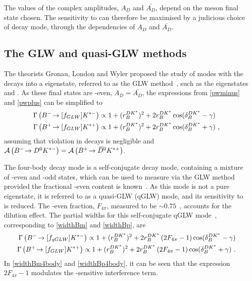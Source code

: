 The values of the complex amplitudes, $A_{D}$ and $\bar{A_{D}}$, depend on the \D meson final state chosen. The sensitivity to \Pgamma can therefore be maximised by a judicious choice of \Dz decay mode, through the dependencies of $A_{D}$ and $\bar{A_{D}}$.

\subsection{The GLW and quasi-GLW methods}
\label{sec:theory:glw}

The theorists Gronau, London and Wyler proposed the study of \decay{\Bm}{\D\Km} modes with the \D decays into a \CP eigenstate, referred to as the GLW method~\cite{GL,GW}, such as the eigenstates \decay{\Dz}{\Kp\Km} and \decay{\Dz}{\pip\pim}. As these final states are \CP-even, $A_{D} = \bar{A_{D}}$, the expressions from \eqns\ref{pwminus} and \ref{pwplus} can be simplified to
\begin{align}
\Gamma\left({{{B}^-}}\!\rightarrow [f_{GLW}]{\ensuremath{{K}^{*-}}}\right) &\propto 1 + (r_B^{DK^*})^2 + 2r_B^{DK^*}\cos(\delta_B^{DK^*} - \gamma) \label{widthBm} \\
\Gamma\left({{{B}^+}}\!\rightarrow [f_{GLW}]{\ensuremath{{K}^{*+}}}\right) &\propto 1 + (r_B^{DK^*})^2 + 2r_B^{DK^*}\cos(\delta_B^{DK^*} + \gamma) \text { ,}\label{widthBp}
\end{align}
assuming that \CP violation in \D decays is negligible and $\mathcal{A}\left({{{B}^-}}\!\rightarrow {\ensuremath{{D}^0}}{\ensuremath{{K}^{*-}}}\right) = \mathcal{A}\left({{{B}^+}}\!\rightarrow {\ensuremath{{\kern 0.2em\overline{\kern -0.2em D}{}}{}^0}}{\ensuremath{{K}^{*+}}}\right)$. 

The four-body \D decay mode \decay{\D}{\pip\pim\pip\pim} is a self-conjugate decay mode, containing a mixture of \CP-even and \CP-odd states, which can be used to measure \Pgamma via the GLW method provided the fractional \CP-even content is known~\cite{NAYAK20151}. As this mode is not a pure \CP eigenstate, it is referred to as a quasi-GLW (qGLW) mode, and its sensitivity to \Pgamma is reduced. The \CP-even fraction, $F_{4\pi}$, measured to be $\sim 0.75$~\cite{charm4pi}, accounts for the dilution effect. The partial widths for this self-conjugate qGLW mode~\cite{NAYAK20151,charm4pi}, corresponding to \eqns\ref{widthBm} and \ref{widthBp}, are
\begin{align}
\Gamma\left({{{B}^-}}\!\rightarrow [f_{qGLW}]{\ensuremath{{K}^{*-}}}\right) \propto 1 + (r_B^{DK^*})^2 + 2r_B^{DK^*}\left(2F_{4\pi} - 1\right)\cos(\delta_B^{DK^*} - \gamma) \label{widthBm4body} \\
\Gamma\left({{{B}^+}}\!\rightarrow [f_{GLW}]{\ensuremath{{K}^{*+}}}\right) \propto 1 + (r_B^{DK^*})^2 + 2r_B^{DK^*}\left(2F_{4\pi} - 1\right)\cos(\delta_B^{DK^*} + \gamma) \text { .} \label{widthBp4body}
\end{align}
In \eqns\ref{widthBm4body} and \ref{widthBp4body}, it can be seen that the expression $2F_{4\pi} - 1$ modulates the \Pgamma-sensitive interference term.


